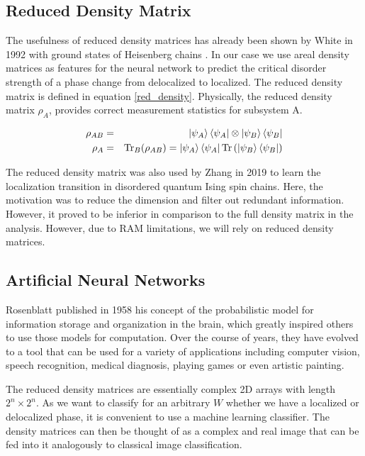 \documentclass[reprint,amsmath,amssymb,aps,prb]{revtex4-2}
\begin{document}
\subsection{Reduced Density Matrix}

The usefulness of reduced density matrices has already been shown by White in 1992 with ground states of Heisenberg chains \cite{White1992}. In our case we use areal density matrices as features for the neural network to predict the critical disorder strength of a phase change from delocalized to localized. The reduced density matrix is defined in equation \ref{red_density}. Physically, the reduced density matrix $\rho_A$, provides correct measurement statistics for subsystem A.

\begin{eqnarray}
\rho_{AB}&=&\ket{\psi_A}\bra{\psi_A}\otimes\ket{\psi_B}\bra{\psi_B}\\
\rho_A&=&\text{Tr}_B(\rho_{AB})=\ket{\psi_A}\bra{\psi_A}\text{Tr}\left(\ket{\psi_B}\bra{\psi_B}\right)\label{red_density}
\end{eqnarray}%

The reduced density matrix was also used by Zhang in 2019 to learn the localization transition in disordered quantum Ising spin chains. Here, the motivation was to reduce the dimension and filter out redundant information. However, it proved to be inferior in comparison to the full density matrix in the analysis. \cite{Zhang2019} However, due to RAM limitations, we will rely on reduced density matrices.


\subsection{Artificial Neural Networks}

Rosenblatt published in 1958 his concept of the probabilistic model for information storage and organization in the brain, which greatly inspired others to use those models for computation.\cite{Rosenblatt1958} Over the course of years, they have evolved to a tool that can be used for a variety of applications including computer vision, speech recognition, medical diagnosis, playing games or even artistic painting.\cite{Gatys2015}

The reduced density matrices are essentially complex 2D arrays with length $2^n\times2^n$. As we want to classify for an arbitrary $W$ whether we have a localized or delocalized phase, it is convenient to use a machine learning classifier. The density matrices can then be thought of as a complex and real image that can be fed into it analogously to classical image classification.
\end{document}
